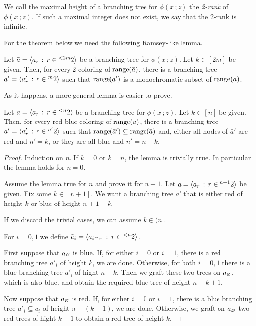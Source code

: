 \documentclass[scombinatorics.tex]{subfiles}
\begin{document}
We call the maximal height of a branching tree for $\phi(x\,;z)$ the \emph{2-rank\/} of  $\phi(x\,;z)$.
If such a maximal integer does not exist, we say that the 2-rank is infinite.

For the theorem below we need the following Ramsey-like lemma.

\begin{lemma}\label{lem_Ramsey_on_trees}
  Let $\bar a=\langle a_r\, :\, r\in{}^{<2m}2\rangle$ be a branching tree for $\phi(x\,;z)$.
  Let $k\in[2m]$ be given.
  Then, for every $2$-coloring of $\mathop{\rm range}(\bar a)$, there is a branching tree $\bar a'=\langle a'_r\, :\, r\in{}^m2\rangle$ such that  $\mathop{\rm range}(\bar a')$ is a monochromatic subset of $\mathop{\rm range}(\bar a)$.\QED
\end{lemma}

As it happens, a more general lemma is easier to prove.

\begin{lemma}
  Let $\bar a=\langle a_r\, :\, r\in{}^{<n}2\rangle$ be a branching tree for $\phi(x\,;z)$.
  Let $k\in[n]$ be given.
  Then, for every red-blue coloring of $\mathop{\rm range}(\bar a)$,  there is a branching tree $\bar a'=\langle a'_r\, :\, r\in{}^{n'}2\rangle$ such that $\mathop{\rm range}(\bar a')\subseteq\mathop{\rm range}(\bar a)$ and, either all nodes of $\bar a'$ are red and $n'=k$, or they are all blue and $n'=n-k$.
\end{lemma}

\begin{proof}
  Induction on $n$. If $k=0$ or $k=n$, the lemma is trivially true.
  In particular the lemma holds for $n=0$.

  Assume the lemma true for $n$ and prove it for $n+1$.
  Let  $\bar a=\langle a_r\, :\, r\in{}^{n+1}2\rangle$ be given.
  Fix some $k\in[n+1]$. 
  We want a branching tree $\bar a'$ that is either red of height $k$ or blue of height $n+1-k$.
  
  If we discard the trivial cases, we can assume $k\in(n]$.

  For $i=0,1$ we define $\bar a_i=\langle a_{i^\frown r}\;:\;r\in {}^{<n}2\rangle$.

  First suppose that $a_\varnothing$ is blue.
  If, for either $i=0$ or $i=1$, there is a red branching tree $\bar a'_i$ of height $k$, we are done.
  Otherwise, for both $i=0,1$ there is a blue branching tree $\bar a'_i$ of hight $n-k$.
  Then we graft these two trees on $a_\varnothing$, which is also blue, and obtain the required blue tree of height $n-k+1$.
  
  Now suppose that $a_\varnothing$ is red.
  If, for either $i=0$ or $i=1$, there is a blue branching tree $\bar a'_i\subseteq \bar a_i$ of height $n-(k-1)$, we are done.
  Otherwise, we graft on $a_\varnothing$ two red trees of hight $k-1$ to obtain a red tree of height $k$.  
\end{proof}
\end{document}
